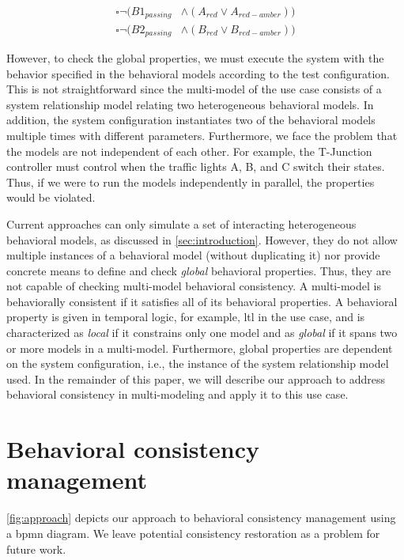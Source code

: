 \documentclass{jot}
\begin{document}
\begin{align}
    \square\neg(B1_{passing} & \land (A_{red} \lor A_{red-amber})) \label{eq:property3} \\
    \square\neg(B2_{passing} & \land (B_{red} \lor B_{red-amber})) \label{eq:property4}
\end{align}

However, to check the global properties, we must execute the system with the behavior specified in the behavioral models according to the test configuration.
This is not straightforward since the multi-model of the use case consists of a system relationship model relating two heterogeneous behavioral models.
In addition, the system configuration instantiates two of the behavioral models multiple times with different parameters.
Furthermore, we face the problem that the models are not independent of each other.
For example, the T-Junction controller must control when the traffic lights A, B, and C switch their states.
Thus, if we were to run the models independently in parallel, the properties would be violated.

Current approaches can only simulate a set of interacting heterogeneous behavioral models, as discussed in \autoref{sec:introduction}.
However, they do not allow multiple instances of a behavioral model (without duplicating it) nor provide concrete means to define and check \emph{global} behavioral properties.
Thus, they are not capable of checking multi-model behavioral consistency.
A multi-model is behaviorally consistent if it satisfies all of its behavioral properties.
A behavioral property is given in temporal logic, for example, \gls*{ltl} in the use case, and is characterized as \emph{local} if it constrains only one model and as \emph{global} if it spans two or more models in a multi-model.
Furthermore, global properties are dependent on the system configuration, i.e., the instance of the system relationship model used.
In the remainder of this paper, we will describe our approach to address behavioral consistency in multi-modeling and apply it to this use case.

\section{Behavioral consistency management} \label{sec:behavioral_consistency_checking}
\autoref{fig:approach} depicts our approach to behavioral consistency management using a \gls*{bpmn} diagram.
We leave potential consistency restoration as a problem for future work.
\end{document}
